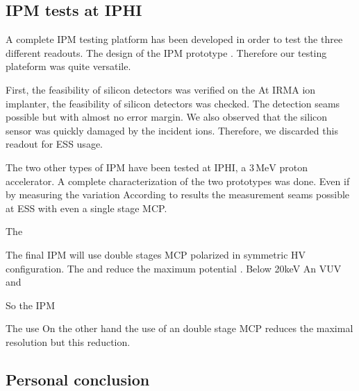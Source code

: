 \begin{refsection}
  \subsection{IPM tests at IPHI}
  A complete IPM testing platform has been developed in order to test the three different readouts.
  The design of the IPM prototype . Therefore our testing plateform was quite versatile. 
  
  First, the feasibility of silicon detectors was verified on the
  At IRMA ion implanter, the feasibility of silicon detectors was checked. 
  The detection seams possible but with almost no error margin. We also observed that the silicon sensor was quickly damaged by the incident ions. Therefore, we discarded this readout for ESS usage.
  
  The two other types of IPM have been tested at IPHI, a $3\,\mathrm{MeV}$ proton accelerator. A complete characterization of the two prototypes was done. Even if by measuring the variation 
  According to results the measurement seams possible at ESS with even a single stage MCP.
  
  The 
  
  The final IPM will use double stages MCP polarized in symmetric HV configuration. The and reduce the maximum potential . Below 20keV 
  An VUV and

  So the IPM  

  The use 
  On the other hand the use of an double stage MCP reduces the maximal resolution but this reduction. 
  

  \subsection{Personal conclusion}

\end{refsection}